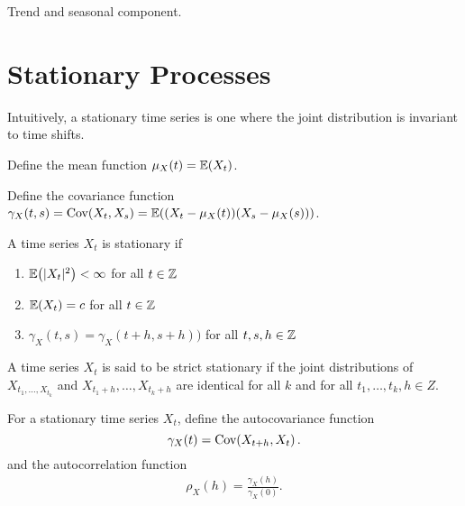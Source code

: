 \begin{exmp}
  \label{defn:time_series:5}
  Trend and seasonal component.
\end{exmp}

\section{Stationary Processes}
\label{sec:stationary-processes}

Intuitively, a stationary time series is one where the joint
distribution is invariant to time shifts.

\begin{defn}
  \label{defn:time_series:7}
  Define the mean function $\mu_{X}(t) = \E{X_{t}}$.

  Define the covariance function $\gamma_{X}(t, s) = \Cov{X_{t}}{X_{s}}
    = \E{(X_{t} - \mu_{X}(t))(X_{s} - \mu_{X}(s))}$.
\end{defn}

\begin{defn}
  \label{defn:time_series:6}
  A time series $X_{t}$ is stationary if
  \begin{enumerate}
  \item $\E{|X_t|^2} < \infty$ for all $t \in \mathbb{Z}$
  \item $\E{X_{t}} = c$ for all $t \in \mathbb{Z}$
  \item $\gamma_{X}(t, s) = \gamma_{X}(t+h, s+h))$ for all $t, s, h
    \in \mathbb{Z}$
  \end{enumerate}
\end{defn}

\begin{defn}
  \label{defn:time_series:8}
  A time series $X_{t}$ is said to be strict stationary if the joint
  distributions of $X_{t_{1}, \dots, X_{t_{k}}}$ and $X_{t_{1} + h},
  \dots, X_{t_{k} + h}$ are identical for all $k$ and for all $t_{1},
  \dots, t_{k}, h \in Z$.
\end{defn}

\begin{defn}
  \label{defn:time_series:9}
  For a stationary time series $X_{t}$, define the autocovariance
  function
  \begin{equation}
    \label{eq:2}
    \gamma_{X}(t) = \Cov{X_{t+h}}{X_{t}}.
  \end{equation}
  and the autocorrelation function
  \begin{align}
    \label{eq:3}
    \rho_{X}(h) = \frac{\gamma_{X}(h)}{\gamma_{X}(0)}.
  \end{align}
\end{defn}

